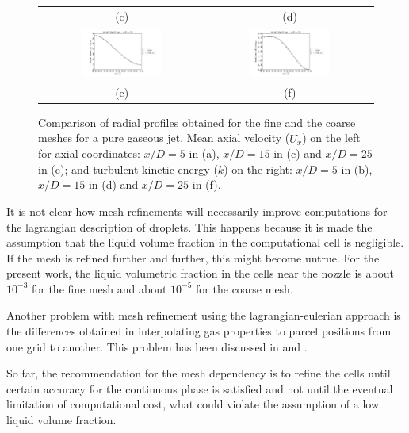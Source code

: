 \begin{figure}[h]
\begin{tabular}{cc}
(c) & (d) \\
\includegraphics[width=0.5\textwidth]{./figuras/chap4/coarse_fine/grid_4_U.png} &   \includegraphics[width=0.5\textwidth]{./figuras/chap4/coarse_fine/grid_4_k.png} \\
(e) & (f)
\end{tabular}
 \caption{Comparison of radial profiles obtained for the fine and the coarse meshes for a pure gaseous jet. Mean axial velocity ($\tilde{U}_x$) on the left for axial coordinates: $x/D=5$ in (a), $x/D=15$ in (c) and $x/D=25$ in (e); and turbulent kinetic energy ($k$) on the right: $x/D=5$ in (b), $x/D=15$ in (d) and $x/D=25$ in (f).}
 \label{fig: grid_test}
\end{figure}

It is not clear how mesh refinements will necessarily improve computations for the lagrangian description of droplets. This happens because it is made the assumption that the liquid volume fraction in the computational cell is negligible. If the mesh is refined further and further, this might become untrue. For the present work, the liquid volumetric fraction in the cells near the nozzle is about $10^{-3}$ for the fine mesh and about $10^{-5}$ for the coarse mesh.

Another problem with mesh refinement using the lagrangian-eulerian approach is the differences obtained in interpolating gas properties to parcel positions from one grid to another. This problem has been discussed in \cite{nordin} and \cite{baumgarten2006mixture}. 

So far, the recommendation for the mesh dependency is to refine the cells until certain accuracy for the continuous phase is satisfied and not until the eventual limitation of computational cost, what could violate the assumption of a low liquid volume fraction.

